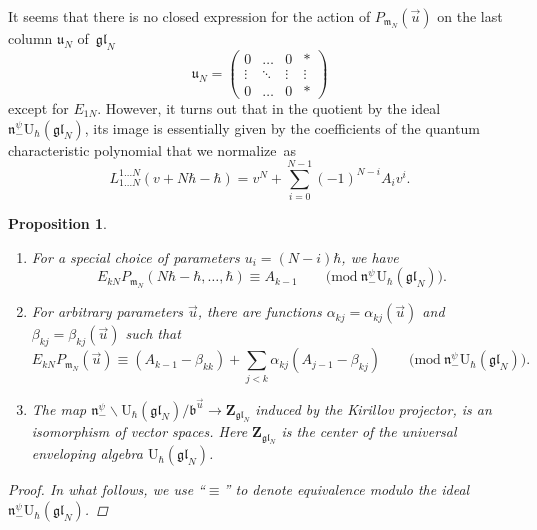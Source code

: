 \documentclass[10pt,a4paper]{article}
\numberwithin{equation}{section}
\newtheorem{Proposition}[Theorem]{Proposition}
{ \theoremstyle{definition}
	\newtheorem{Definition}[Theorem]{Definition}
	\newtheorem{Note}[Theorem]{Note}
	\newtheorem{Example}[Theorem]{Example}
	\newtheorem{Remark}[Theorem]{Remark} }
\newcommand{\U}{\mathrm{U}_{\hbar}}
\newcommand{\Z}{\mathbf{Z}}
\renewcommand{\b}{\mathfrak{b}}
\newcommand{\n}{\mathfrak{n}}
\renewcommand{\u}{\mathfrak{u}}
\newcommand{\m}{\mathfrak{m}}
\newcommand{\gl}{\mathfrak{gl}}
\begin{document}
	
	It seems that there is no closed expression for the action of $P_{\m_N}(\vec{u})$ on the last column $\u_N$ of~$\gl_N$
	\[
	\u_N = \begin{pmatrix}
		0 & \dots & 0 & * \\
		\vdots & \ddots & \vdots & \vdots \\
		0 & \dots & 0 & *
	\end{pmatrix}
	\]
	except for $E_{1N}$. However, it turns out that in the quotient by the ideal $\n_-^{\psi} \U(\gl_N)$, its image is essentially given by the coefficients of the quantum characteristic polynomial that we normalize~as
	\[%
		L_{1\dots N}^{1\dots N}(v+N\hbar - \hbar) = v^N + \sum_{i=0}^{N-1} (-1)^{N-i} A_i v^i.
	\]
	\begin{Proposition}\quad
		\label{prop::last_col_center_iso}
		\begin{enumerate}\itemsep=0pt
			\item[$(1)$] For a special choice of parameters $u_i = (N-i)\hbar$, we have
			\[
			E_{kN} P_{\m_N}(N\hbar-\hbar,\dots,\hbar) \equiv A_{k-1} \qquad \bigl(\mathrm{mod}\ \n_-^{\psi} \U(\gl_N)\bigr).
			\]
			
			\item[$(2)$] For arbitrary parameters $\vec{u}$, there are functions $\alpha_{kj} = \alpha_{kj}(\vec{u})$ and $\beta_{kj} = \beta_{kj}(\vec{u})$ such that
			\[
			E_{kN} P_{\m_N} (\vec{u}) \equiv (A_{k-1} - \beta_{kk}) + \sum_{j < k} \alpha_{kj} (A_{j-1}-\beta_{kj}) \qquad \bigl(\mathrm{mod}\ \n_-^{\psi} \U(\gl_N)\bigr).
			\]
			
			\item[$(3)$] The map
			$
				\n_-^{\psi} \backslash \U(\gl_N) / \b^{\vec{u}} \rightarrow \Z_{\gl_N}$
			induced by the Kirillov projector, is an isomorphism of vector spaces. Here $\Z_{\gl_N}$ is the center of the universal enveloping algebra $\U(\gl_N)$.
		\end{enumerate}
		
		\begin{proof}
			In what follows, we use ``$\equiv$'' to denote equivalence modulo the ideal $\n_-^{\psi} \U(\gl_N)$.
			

\end{proof}
\end{Proposition}
\end{document}

